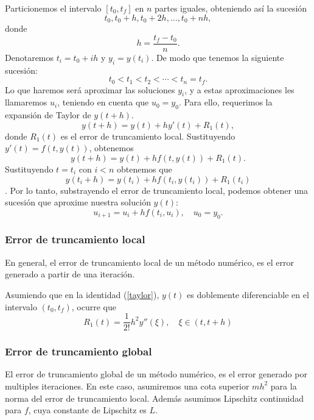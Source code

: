 Particionemos el intervalo $[t_0, t_f]$ en $n$ partes iguales, obteniendo así la sucesión 
$$t_0, t_0 + h, t_0 + 2h, ... , t_0 + nh,$$
donde
$$h = \frac{t_f - t_0}{n}.$$
Denotaremos $t_i = t_0 + ih$ y  $y_i = y(t_i)$. De modo que tenemos la siguiente sucesión:
\begin{equation}
    t_0 < t_1 < t_2 < \cdots < t_n = t_f.
\end{equation}
Lo que haremos será aproximar las soluciones $y_i$, y a estas aproximaciones les llamaremos $u_i$, teniendo en cuenta que $u_0 = y_0$. Para ello, requerimos la expansión de Taylor de $y(t + h)$.
\begin{equation}
    \label{taylor}
    y(t + h) = y(t) + hy'(t) + R_1(t),
\end{equation}
donde $R_1(t)$ es el error de truncamiento local. Sustituyendo $y'(t) = f(t, y(t))$, obtenemos 
\begin{equation}
    y(t+h) = y(t) + hf(t,y(t)) + R_1(t).
\end{equation}
Sustituyendo $t = t_i$ con $i < n$ obtenemos que
\begin{equation}
    y(t_i + h) = y(t_i) + hf(t_i, y(t_i)) + R_1(t_i)
\end{equation}.
Por lo tanto, substrayendo el error de truncamiento local, podemos obtener una sucesión que aproxime nuestra solución $y(t)$:
\begin{equation}
    u_{i+1} = u_i + hf(t_i, u_i), \quad u_0 = y_0.
\end{equation} 

\subsubsection{Error de truncamiento local}
En general, el error de truncamiento local de un método numérico, es el error generado a partir de una iteración.

Asumiendo que en la identidad (\ref{taylor}), $y(t)$ es doblemente diferenciable en el intervalo $(t_0, t_f)$, ocurre que
\begin{equation}
    R_1(t) = \frac{1}{2!} h^2y''(\xi),  \quad \xi\in (t, t+h)
\end{equation}
\subsubsection{Error de truncamiento global}
El error de truncamiento global de un método numérico, es el error generado por multiples iteraciones. En este caso, asumiremos una cota superior $mh^2$ para la norma del error de truncamiento local. Además asumimos Lipschitz continuidad para $f$, cuya constante de Lipschitz es $L$.

